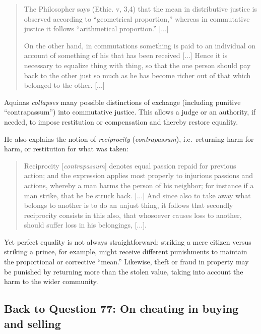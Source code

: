         \begin{quote}
            The Philosopher says (Ethic. v, 3,4) that the mean in distributive justice is observed according to ``geometrical proportion,'' whereas in commutative justice it follows “arithmetical proportion.” [...]
            
            On the other hand, in commutations something is paid to an individual on account of something of his that has been received [...] Hence it is necessary to equalize thing with thing, so that the one person should pay back to the other just so much as he has become richer out of that which belonged to the other. [...]
        \end{quote}

        \begin{remark}
            Aquinas \emph{collapses} many possible distinctions of exchange (including punitive “contrapassum”) into commutative justice. This allows a judge or an authority, if needed, to impose restitution or compensation and thereby restore equality.
        \end{remark}

        He also explains the notion of \emph{reciprocity} (\textit{contrapassum}), i.e.\ returning harm for harm, or restitution for what was taken:
        
        \begin{quote}
            Reciprocity [\textit{contrapassum}] denotes equal passion repaid for previous action; and the expression applies most properly to injurious passions and actions, whereby a man harms the person of his neighbor; for instance if a man strike, that he be struck back. [...] And since also to take away what belongs to another is to do an unjust thing, it follows that secondly reciprocity consists in this also, that whosoever causes loss to another, should suffer loss in his belongings, [...]. 
        \end{quote}
        
        Yet perfect equality is not always straightforward: striking a mere citizen versus striking a prince, for example, might receive different punishments to maintain the proportional or corrective “mean.” Likewise, theft or fraud in property may be punished by returning more than the stolen value, taking into account the harm to the wider community.

    \subsection*{Back to Question 77: On cheating in buying and selling}


